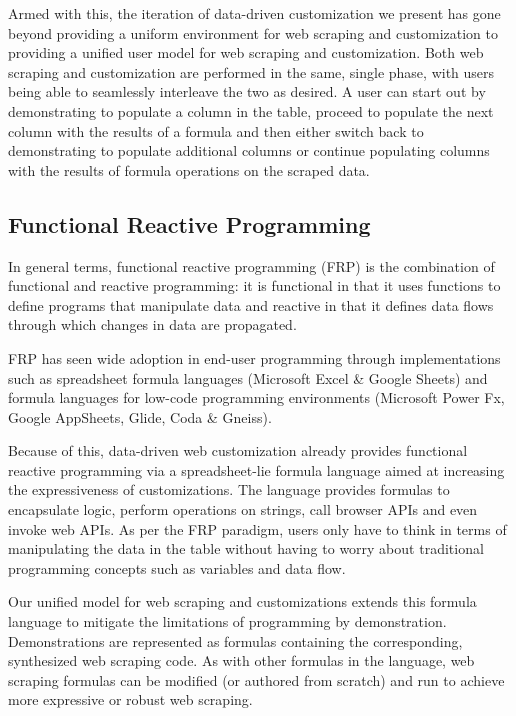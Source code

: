 \documentclass[sigconf,10pt]{acmart}
\begin{document}
Armed with this, the iteration of data-driven customization we present
has gone beyond providing a uniform environment for web scraping and
customization to providing a unified user model for web scraping and
customization. Both web scraping and customization are performed in the
same, single phase, with users being able to seamlessly interleave the
two as desired. A user can start out by demonstrating to populate a
column in the table, proceed to populate the next column with the
results of a formula and then either switch back to demonstrating to
populate additional columns or continue populating columns with the
results of formula operations on the scraped data.

\hypertarget{functional-reactive-programming}{%
\subsection{Functional Reactive
Programming}\label{functional-reactive-programming}}

In general terms, functional reactive programming (FRP) is the
combination of functional and reactive programming: it is functional in
that it uses functions to define programs that manipulate data and
reactive in that it defines data flows through which changes in data are
propagated.

FRP has seen wide adoption in end-user programming through
implementations such as spreadsheet formula languages (Microsoft Excel
\& Google Sheets) and formula languages for low-code programming
environments (Microsoft Power Fx, Google AppSheets, Glide, Coda \&
Gneiss).

Because of this, data-driven web customization already provides
functional reactive programming via a spreadsheet-lie formula language
aimed at increasing the expressiveness of customizations. The language
provides formulas to encapsulate logic, perform operations on strings,
call browser APIs and even invoke web APIs. As per the FRP paradigm,
users only have to think in terms of manipulating the data in the table
without having to worry about traditional programming concepts such as
variables and data flow.

Our unified model for web scraping and customizations extends this
formula language to mitigate the limitations of programming by
demonstration. Demonstrations are represented as formulas containing the
corresponding, synthesized web scraping code. As with other formulas in
the language, web scraping formulas can be modified (or authored from
scratch) and run to achieve more expressive or robust web scraping.
\end{document}
